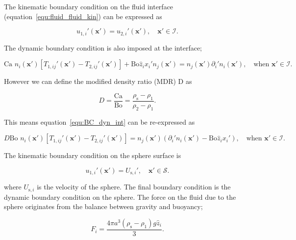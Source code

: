 \documentclass[12pt]{article}
\begin{document}
The kinematic boundary condition on the fluid interface (equation~\ref{equ:fluid_fluid_kin}) can be expressed as  

\begin{equation}
\label{equ:BC_kin_int_nodim}
u_{1,i}'(\boldsymbol{x'}) = u_{2,i}'(\boldsymbol{x'}), \quad \boldsymbol{x'} \in \mathcal{I}.
\end{equation}

The dynamic boundary condition is also imposed at the interface;

\begin{equation}
\label{equ:BC_dyn_int}
\text{Ca } n_{i}(\boldsymbol{x'}) [T_{1, ij}'(\boldsymbol{x'}) - T_{2,ij}'(\boldsymbol{x'})] + \text{Bo} \hat{z}_{i} x_{i}' n_{j}(\boldsymbol{x'}) = n_{j}(\boldsymbol{x'}) \partial_{i}' n_{i}(\boldsymbol{x'}), \quad \text{when } \boldsymbol{x'} \in \mathcal{I}.
\end{equation}

However we can define the modified density ratio (MDR) D as

\begin{equation}
\label{equ:dim_dens_rat}
D = \frac{\text{Ca}}{\text{Bo}} = \frac{\rho_{\text{s}} - \rho_{1}}{\rho_{2} - \rho_{1}}.
\end{equation}

This means equation~\ref{equ:BC_dyn_int} can be re-expressed as

\begin{equation}
\label{equ:d_int}
D \text{Bo } n_{i}(\boldsymbol{x'}) [T_{1, ij}'(\boldsymbol{x'}) - T_{2, ij}'(\boldsymbol{x'})] = n_{j}(\boldsymbol{x'})(\partial_{i}' n_{i}(\boldsymbol{x'}) - \text{Bo} \hat{z}_{i} x_{i}'), \quad \text{when } \boldsymbol{x'} \in \mathcal{I}.
\end{equation}

The kinematic boundary condition on the sphere surface is 

\begin{equation}
\label{equ:BC_kin_spere}
u_{1,i}'(\boldsymbol{x'}) = U_{\text{s},i}', \quad \boldsymbol{x'} \in \mathcal{S}.
\end{equation}

where $U_{\text{s},i}$ is the velocity of the sphere. The final boundary condition is the dynamic boundary condition on the sphere. The force on the fluid due to the sphere originates from the balance between gravity and buoyancy;

\begin{equation}
\label{equ:sphere_force}
F_{i} = \frac{4 \pi a^{3} (\rho_{\text{s}} - \rho_{1}) g \hat{z}_{i}}{3}.
\end{equation}
\end{document}
